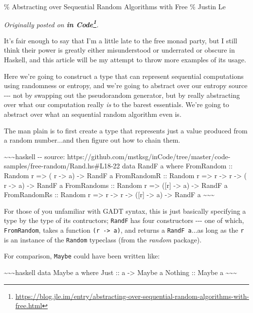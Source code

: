 \documentclass[]{article}
\renewcommand{\href}[2]{#2\footnote{\url{#1}}}
\begin{document}
\% Abstracting over Sequential Random Algorithms with Free \% Justin Le

\emph{Originally posted on
\textbf{\href{https://blog.jle.im/entry/abstracting-over-sequential-random-algorithms-with-free.html}{in
Code}}.}

It's fair enough to say that I'm a little late to the free monad party, but I
still think their power is greatly either misunderstood or underrated or obscure
in Haskell, and this article will be my attempt to throw more examples of its
usage.

Here we're going to construct a type that can represent sequential computations
using randomness or entropy, and we're going to abstract over our entropy source
-\/-\/- not by swapping out the pseudorandom generator, but by really
abstracting over what our computation really \emph{is} to the barest essentials.
We're going to abstract over what an sequential random algorithm even is.

The man plain is to first create a type that represents just a value produced
from a random number...and then figure out how to chain them.

\textasciitilde{}\textasciitilde{}\textasciitilde{}haskell -\/- source:
https://github.com/mstksg/inCode/tree/master/code-samples/free-random/Rand.hs\#L18-22
data RandF a where FromRandom :: Random r =\textgreater{} ( r -\textgreater{} a)
-\textgreater{} RandF a FromRandomR :: Random r =\textgreater{} r
-\textgreater{} r -\textgreater{} ( r -\textgreater{} a) -\textgreater{} RandF a
FromRandoms :: Random r =\textgreater{} ({[}r{]} -\textgreater{} a)
-\textgreater{} RandF a FromRandomRs :: Random r =\textgreater{} r
-\textgreater{} r -\textgreater{} ({[}r{]} -\textgreater{} a) -\textgreater{}
RandF a \textasciitilde{}\textasciitilde{}\textasciitilde{}

For those of you unfamiliar with GADT syntax, this is just basically specifying
a type by the type of its contructors; \texttt{RandF} has four constructors
-\/-\/- one of which, \texttt{FromRandom}, takes a function
\texttt{(r\ -\textgreater{}\ a)}, and returns a \texttt{RandF\ a}...as long as
the \texttt{r} is an instance of the \texttt{Random} typeclass (from the
\emph{random} package).

For comparison, \texttt{Maybe} could have been written like:

\textasciitilde{}\textasciitilde{}\textasciitilde{}haskell data Maybe a where
Just :: a -\textgreater{} Maybe a Nothing :: Maybe a
\textasciitilde{}\textasciitilde{}\textasciitilde{}
\end{document}
